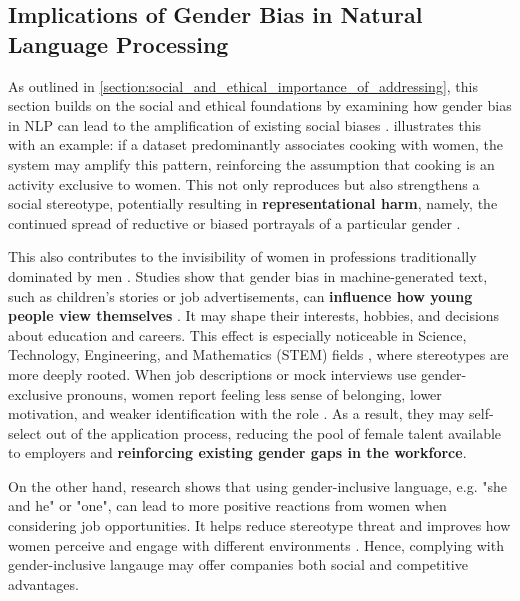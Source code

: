 \subsection{Implications of Gender Bias in Natural Language Processing} \label{subsection:implications_of_gb_in_nlp}
As outlined in \autoref{section:social_and_ethical_importance_of_addressing}, this section builds on the social and ethical foundations by examining how gender bias in NLP can lead to the amplification of existing social biases \citep{rescignoGenderBiasMachine2023}.
\citet{ullmannGenderBiasMachine2022} illustrates this with an example: if a dataset predominantly associates cooking with women, the system may amplify this pattern, reinforcing the assumption that cooking is an activity exclusive to women. This not only reproduces but also strengthens a social stereotype, potentially resulting in \textbf{representational harm}, namely, the continued spread of reductive or biased portrayals of a particular gender \citep{stanczakSurveyGenderBias2021}. 

This also contributes to the invisibility of women in professions traditionally dominated by men \citep{kapplAreAllSpanish2025}. Studies show that gender bias in machine-generated text, such as children's stories or job advertisements, can \textbf{influence how young people view themselves} \citep{soundararajanInvestigatingGenderBias2024,kapplAreAllSpanish2025}. It may shape their interests, hobbies, and decisions about education and careers. This effect is especially noticeable in Science, Technology, Engineering, and Mathematics (STEM) fields \citep{pratesAssessingGenderBias2019}, where stereotypes are more deeply rooted. When job descriptions or mock interviews use gender-exclusive pronouns, women report feeling less sense of belonging, lower motivation, and weaker identification with the role \citep{godsilEffectsGenderRoles2016}. As a result, they may self-select out of the application process, reducing the pool of female talent available to employers and \textbf{reinforcing existing gender gaps in the workforce}.

On the other hand, research shows that using gender-inclusive language, e.g. "she and he" or "one", can lead to more positive reactions from women when considering job opportunities. It helps reduce stereotype threat and improves how women perceive and engage with different environments \citep{ godsilEffectsGenderRoles2016}. Hence, complying with gender-inclusive langauge may offer companies both social and competitive advantages.



